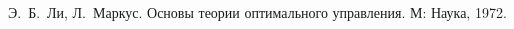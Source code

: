 


        
        
        \tableofcontents

        
        
        
        
        
        \begin{thebibliography}{9}
                Э.~Б.~Ли, Л.~Маркус. Основы теории оптимального управления. М: Наука, 1972.
        \end{thebibliography}

